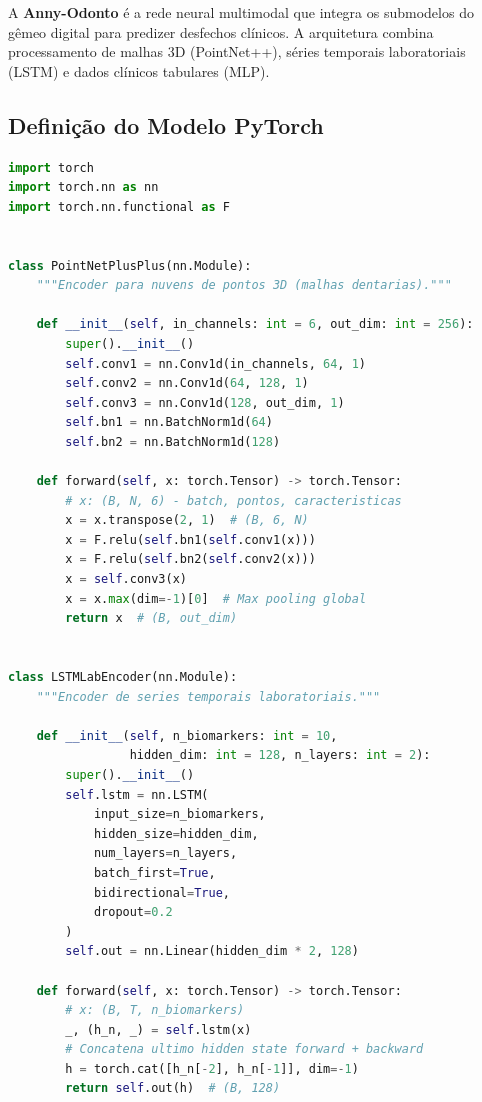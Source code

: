 A \textbf{Anny-Odonto} é a rede neural multimodal que integra os submodelos do gêmeo digital para predizer desfechos clínicos. A arquitetura combina processamento de malhas 3D (PointNet++), séries temporais laboratoriais (LSTM) e dados clínicos tabulares (MLP).

\subsection{Definição do Modelo PyTorch}
\label{subsec:modelo-pytorch}

\begin{lstlisting}[language=Python, caption=Arquitetura Anny-Odonto em PyTorch, label=code:anny-odonto]
import torch
import torch.nn as nn
import torch.nn.functional as F


class PointNetPlusPlus(nn.Module):
    """Encoder para nuvens de pontos 3D (malhas dentarias)."""

    def __init__(self, in_channels: int = 6, out_dim: int = 256):
        super().__init__()
        self.conv1 = nn.Conv1d(in_channels, 64, 1)
        self.conv2 = nn.Conv1d(64, 128, 1)
        self.conv3 = nn.Conv1d(128, out_dim, 1)
        self.bn1 = nn.BatchNorm1d(64)
        self.bn2 = nn.BatchNorm1d(128)

    def forward(self, x: torch.Tensor) -> torch.Tensor:
        # x: (B, N, 6) - batch, pontos, caracteristicas
        x = x.transpose(2, 1)  # (B, 6, N)
        x = F.relu(self.bn1(self.conv1(x)))
        x = F.relu(self.bn2(self.conv2(x)))
        x = self.conv3(x)
        x = x.max(dim=-1)[0]  # Max pooling global
        return x  # (B, out_dim)


class LSTMLabEncoder(nn.Module):
    """Encoder de series temporais laboratoriais."""

    def __init__(self, n_biomarkers: int = 10,
                 hidden_dim: int = 128, n_layers: int = 2):
        super().__init__()
        self.lstm = nn.LSTM(
            input_size=n_biomarkers,
            hidden_size=hidden_dim,
            num_layers=n_layers,
            batch_first=True,
            bidirectional=True,
            dropout=0.2
        )
        self.out = nn.Linear(hidden_dim * 2, 128)

    def forward(self, x: torch.Tensor) -> torch.Tensor:
        # x: (B, T, n_biomarkers)
        _, (h_n, _) = self.lstm(x)
        # Concatena ultimo hidden state forward + backward
        h = torch.cat([h_n[-2], h_n[-1]], dim=-1)
        return self.out(h)  # (B, 128)



\end{lstlisting}
